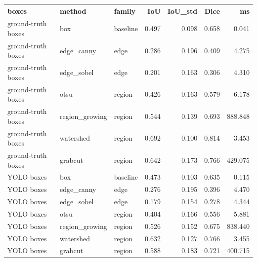 \begin{tabular}{lllrrrr}
\toprule
boxes & method & family & IoU & IoU_std & Dice & ms \\
\midrule
ground-truth boxes & box & baseline & 0.497 & 0.098 & 0.658 & 0.041 \\
ground-truth boxes & edge_canny & edge & 0.286 & 0.196 & 0.409 & 4.275 \\
ground-truth boxes & edge_sobel & edge & 0.201 & 0.163 & 0.306 & 4.310 \\
ground-truth boxes & otsu & region & 0.426 & 0.163 & 0.579 & 6.178 \\
ground-truth boxes & region_growing & region & 0.544 & 0.139 & 0.693 & 888.848 \\
ground-truth boxes & watershed & region & 0.692 & 0.100 & 0.814 & 3.453 \\
ground-truth boxes & grabcut & region & 0.642 & 0.173 & 0.766 & 429.075 \\
YOLO boxes & box & baseline & 0.473 & 0.103 & 0.635 & 0.115 \\
YOLO boxes & edge_canny & edge & 0.276 & 0.195 & 0.396 & 4.470 \\
YOLO boxes & edge_sobel & edge & 0.179 & 0.154 & 0.278 & 4.344 \\
YOLO boxes & otsu & region & 0.404 & 0.166 & 0.556 & 5.881 \\
YOLO boxes & region_growing & region & 0.526 & 0.152 & 0.675 & 838.440 \\
YOLO boxes & watershed & region & 0.632 & 0.127 & 0.766 & 3.455 \\
YOLO boxes & grabcut & region & 0.588 & 0.183 & 0.721 & 400.715 \\
\bottomrule
\end{tabular}
